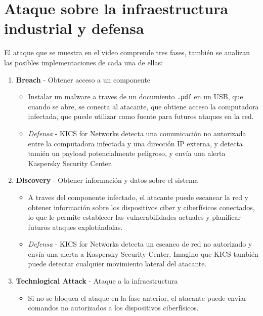 
\section{Ataque sobre la infraestructura industrial y defensa}

El ataque que se muestra en el video comprende tres fases, también se analizan las posibles implementaciones de cada una de ellas:
\begin{enumerate}
   \item \textbf{Breach} - Obtener acceso a un componente
   \begin{itemize}
      \item Instalar un malware a traves de un documiento \texttt{.pdf} en un USB, que cuando se abre, se conecta al atacante, que obtiene acceso la computadora infectada, que puede utilizar como fuente para futuros ataques en la red.
      \item \textit{Defensa} - KICS for Networks detecta una comunicación no autorizada entre la computadora infectada y una dirección IP externa, y detecta tamién un payload potencialmente peligroso, y envía una alerta Kaspersky Security Center.
   \end{itemize}
   \item \textbf{Discovery} - Obtener información y datos sobre el sistema
   \begin{itemize}
      \item A traves del componente infectado, el atacante puede escanear la red y obtener información sobre los dispositivos ciber y ciberfísicos conectados, lo que le permite establecer las vulnerabilidades actuales y planificar futuros ataques explotándolas.
      \item \textit{Defensa} - KICS for Networks detecta un escaneo de red no autorizado y envía una alerta a Kaspersky Security Center. Imagino que KICS también puede detectar cualquier movimiento lateral del atacante.
   \end{itemize}
   \item \textbf{Technlogical Attack} - Ataque a la infraestructura
   \begin{itemize}
      \item Si no se bloquea el ataque en la fase anterior, el atacante puede enviar comandos no autorizados a los dispositivos ciberfísicos.\\

\end{itemize}
\end{enumerate}
